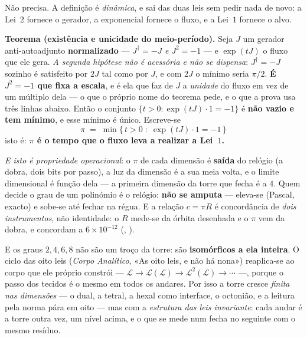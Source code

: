 \documentclass[livro.tex]{subfiles}
\begin{document}
\medskip
\noindent Não precisa. A definição é \emph{dinâmica}, e sai das duas leis sem pedir nada de novo:
a Lei~$2$ fornece o gerador, a exponencial fornece o fluxo, e a Lei~$1$ fornece o alvo.

\begin{mdframed}[linewidth=0.4pt,innerleftmargin=10pt,innerrightmargin=10pt,
                 innertopmargin=8pt,innerbottommargin=8pt,skipabove=6pt,skipbelow=6pt]
\textbf{Teorema (existência e unicidade do meio-período).} Seja $J$ um gerador
anti-autoadjunto \textbf{normalizado} --- $J^{\dagger}=-J$ \emph{e} $J^{2}=-1$ --- e $\exp(tJ)$ o
fluxo que ele gera. \emph{A segunda hipótese não é acessória e não se dispensa}: $J^{\dagger}=-J$
sozinho é satisfeito por $2J$ tal como por $J$, e com $2J$ o mínimo seria $\pi/2$. \textbf{É $J^2=-1$
que fixa a escala}, e é ela que faz de $J$ a \emph{unidade} do fluxo em vez de um múltiplo dela ---
o que o próprio nome do teorema pede, e o que a prova usa três linhas abaixo. Então o conjunto
$\{t>0:\exp(tJ)\cdot 1=-1\}$ é \textbf{não vazio e tem mínimo}, e esse mínimo é único. Escreve-se
\[
  \boxed{\;\pi \;=\; \min\{\,t>0 \;:\; \exp(tJ)\cdot 1 = -1\,\}\;}
\]
isto é: \textbf{$\pi$ é o tempo que o fluxo leva a realizar a Lei~$1$.}

\smallskip
\noindent \emph{E isto é propriedade operacional}: o $\pi$ de cada dimensão é \textbf{saída} do
relógio (a dobra, dois bits por passo), a luz da dimensão é a sua meia volta, e o limite dimensional
é função dela --- a primeira dimensão da torre que fecha é a $4$. Quem decide o grau de um polinómio
é o relógio: \textbf{não se amputa} --- eleva-se (Pascal, exacto) e sobe-se até fechar na régua.
E a relação $c=\pi R$ é concordância de \emph{dois instrumentos}, não identidade: o $R$ mede-se da
órbita desenhada e o $\pi$ vem da dobra, e concordam a $6\times10^{-12}$
(, ).

\smallskip
\noindent E os graus $2,4,6,8$ não são um troço da torre: são \textbf{isomórficos a ela
inteira}. O ciclo das oito leis (\emph{Corpo Analítico}, «As oito leis, e não há nona»)
reaplica-se ao corpo que ele próprio constrói --- $\mathcal L\to\mathcal L(\mathcal L)\to
\mathcal L^{2}(\mathcal L)\to\cdots$ ---, porque o passo dos tecidos é o mesmo em todos os
andares. Por isso a torre cresce \emph{finita nas dimensões} --- o dual, a tetral, a hexal
como interface, o octonião, e a leitura pela norma pára em oito --- mas com a
\emph{estrutura das leis invariante}: cada andar é a torre outra vez, um nível acima, e o
que se mede num fecha no seguinte com o mesmo resíduo.


\end{mdframed}
\end{document}
